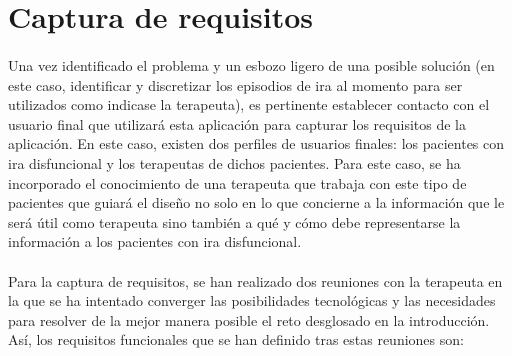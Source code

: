 \section{Captura de requisitos}
\paragraph{}
Una vez identificado el problema y un esbozo ligero de una posible solución (en este caso, identificar y discretizar los episodios de ira al momento para ser utilizados como indicase la terapeuta), es pertinente establecer contacto con el usuario final que utilizará esta aplicación para capturar los requisitos de la aplicación. En este caso, existen dos perfiles de usuarios finales: los pacientes con ira disfuncional y los terapeutas de dichos pacientes. Para este caso, se ha incorporado el conocimiento de una terapeuta que trabaja con este tipo de pacientes que guiará el diseño no solo en lo que concierne a la información que le será útil como terapeuta sino también a qué y cómo debe representarse la información a los pacientes con ira disfuncional.

\paragraph{}
Para la captura de requisitos, se han realizado dos reuniones con la terapeuta en la que se ha intentado converger las posibilidades tecnológicas y las necesidades para resolver de la mejor manera posible el reto desglosado en la introducción. Así, los requisitos funcionales que se han definido tras estas reuniones son:

